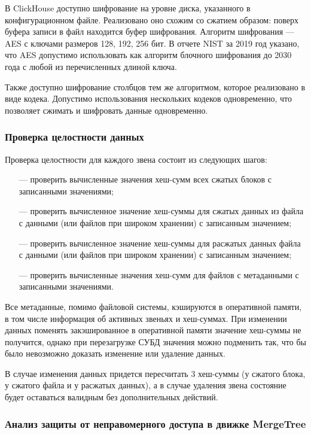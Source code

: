В ClickHouse доступно шифрование на уровне диска, указанного в конфигурационном файле. Реализовано оно схожим со сжатием образом: поверх буфера записи в файл находится буфер шифрования. Алгоритм шифрования --- AES с ключами размеров 128, 192, 256 бит. В отчете NIST \cite{nist} за 2019 год указано, что AES допустимо использовать как алгоритм блочного шифрования до 2030 года с любой из перечисленных длиной ключа.

Также доступно шифрование столбцов тем же алгоритмом, которое реализовано в виде кодека. Допустимо использования нескольких кодеков одновременно, что позволяет сжимать и шифровать данные одновременно.

\subsubsection{Проверка целостности данных}

Проверка целостности для каждого звена состоит из следующих шагов:
\begin{itemize}
	\item [---] проверить вычисленные значения хеш-сумм всех сжатых блоков с записанными значениями;
	\item [---] проверить вычисленное значение хеш-суммы для сжатых данных из файла с данными (или файлов при широком хранении) с записанным значением;
	\item [---] проверить вычисленное значение хеш-суммы для расжатых данных файла с данными (или файлов при широком хранении) с записанным значением;
	\item [---] проверить вычисленные значения хеш-сумм для файлов с метаданными с записанными значениями.
\end{itemize}

Все метаданные, помимо файловой системы, кэшируются в оперативной памяти, в том числе информация об активных звеньях и хеш-суммах. При изменении данных поменять закэшированное в оперативной памяти значение хеш-суммы не получится, однако при перезагрузке СУБД значения можно подменить так, что бы было невозможно доказать изменение или удаление данных.

В случае изменения данных придется пересчитать 3 хеш-суммы (у сжатого блока, у сжатого файла и у расжатых данных), а в случае удаления звена состояние будет оставаться валидным без дополнительных действий.

\subsubsection{Анализ защиты от неправомерного доступа в движке MergeTree}

